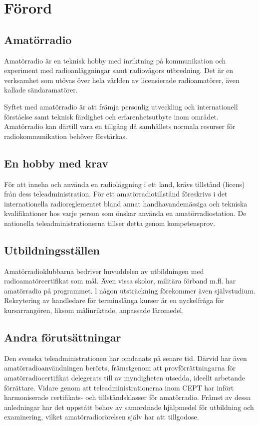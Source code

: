 
\chapter*{Förord}

\section*{Amatörradio}

Amatörradio är en teknisk hobby med inriktning på kommunikation och experiment
med radioanläggningar samt radiovågors utbredning. Det är en verksamhet som
utövas över hela världen av licensierade radioamatörer, även kallade
sändaramatörer.

Syftet med amatörradio är att främja personlig utveckling och internationell
förståelse samt teknisk färdighet och erfarenhetsutbyte inom området.
Amatörradio kan därtill vara en tillgång då samhällets normala resurser för
radiokommunikation behöver förstärkas.

\section*{En hobby med krav}

För att inneha och använda en radioläggning i ett land, krävs tillstånd (licens)
från dess teleadministration. För ett amatörradiotillstånd föreskrivs i det
internationella radioreglementet bland annat handhavandemässiga och tekniska
kvalifikationer hos varje person som önskar använda en amatörradiostation. De
nationella teleadministrationerna tillser detta genom kompetensprov.

\section*{Utbildningsställen}

Amatörradioklubbarna bedriver huvuddelen av utbildningen med
radioamatörcertifikat som mål. Även vissa skolor, militära förband m.fl. har
amatörradio på programmet. l någon utsträckning förekommer även självstudium.
Rekrytering av handledare för terminslånga kurser är en nyckelfråga för
kursarrangören, liksom målinriktade, anpassade läromedel.

\section*{Andra förutsättningar}

Den svenska teleadministrationen har omdanats på senare tid. Därvid har även
amatörradioanvändningen berörts, främstgenom att provförrättningarna för
amatörradiocertifikat delegerats till av myndigheten utsedda, ideellt arbetande
förrättare. Vidare genom att teleadministrationerna inom CEPT har infört
harmoniserade certifikats- och tillståndsklasser för amatörradio. Främst av
dessa anledningar har det uppstått behov av samordnade hjälpmedel för utbildning
och examinering, vilket amatörradiorörelsen själv har att tillgodose.

